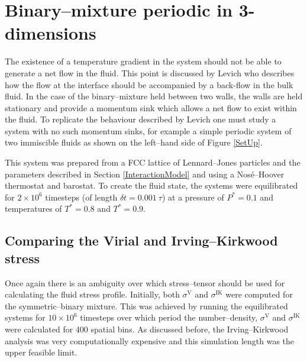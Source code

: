 \section{Binary--mixture periodic in 3-dimensions}
The existence of a temperature gradient in the system should not be able to generate a net flow in the fluid. 
This point is discussed by Levich who describes how the flow at the interface should be accompanied by a back-flow in the bulk fluid.\cite{Levich}
In the case of the binary--mixture held between two walls, the walls are held stationary and provide a momentum sink which allows a net flow to exist within the fluid.
To replicate the behaviour described by Levich one must study a system with no such momentum sinks, for example a simple periodic system of two immiscible fluids as shown on the left--hand side of Figure \ref{SetUp}.

This system was prepared from a FCC lattice of Lennard--Jones particles and the parameters described in Section \ref{InteractionModel} and using a Nos\'e--Hoover thermostat and barostat.
To create the fluid state, the systems were equilibrated for $2 \times 10^{6}$ timesteps (of length $\delta t = 0.001\ \tau$) at a pressure of $P^{*} = 0.1$ and temperatures of $T^{*}=0.8$ and $T^{*}=0.9$.

\subsection{Comparing the Virial and Irving--Kirkwood stress}
Once again there is an ambiguity over which stress--tensor should be used for calculating the fluid stress profile.
Initially, both $\sigma^{\mathrm{V}}$ and $\sigma^{\mathrm{IK}}$ were computed for the symmetric--binary mixture.
This was achieved by running the equilibrated systems for $10 \times 10^{6}$ timesteps over which period the number--density, $\sigma^{\mathrm{V}}$ and $\sigma^{\mathrm{IK}}$ were calculated for 400 spatial bins.
As discussed before, the Irving--Kirkwood analysis was very computationally expensive and this simulation length was the upper feasible limit.
\FloatBarrier

